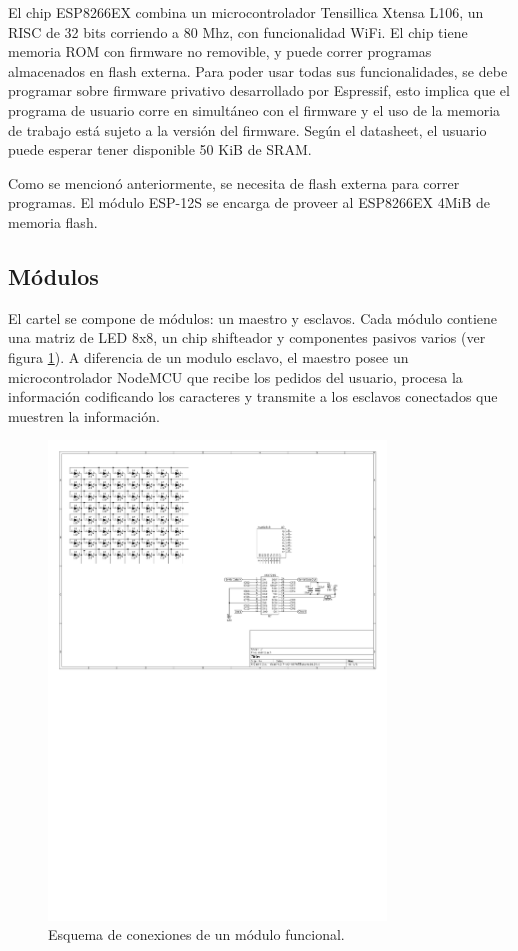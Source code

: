 El chip ESP8266EX combina un microcontrolador Tensillica Xtensa L106, un RISC de 32 bits corriendo a 80 Mhz, con funcionalidad WiFi. \cite{ESP8266Datasheet} El chip tiene memoria ROM con firmware no removible, y puede correr programas almacenados en flash externa. Para poder usar todas sus funcionalidades, se debe programar sobre firmware privativo desarrollado por Espressif, esto implica que el programa de usuario corre en simultáneo con el firmware y el uso de la memoria de trabajo está sujeto a la versión del firmware. Según el datasheet, el usuario puede esperar tener disponible 50 KiB de SRAM.

Como se mencionó anteriormente, se necesita de flash externa para correr programas. El módulo ESP-12S se encarga de proveer al ESP8266EX 4MiB de memoria flash.

\subsection{Módulos}
El cartel se compone de módulos: un maestro y esclavos. Cada módulo contiene una matriz de LED 8x8, un chip shifteador \cite{MAX7219} y componentes pasivos varios (ver figura \ref{fig:hw-moduloEsquematico}). A diferencia de un modulo esclavo, el maestro posee un microcontrolador NodeMCU que recibe los pedidos del usuario, procesa la información codificando los caracteres y transmite a los esclavos conectados que muestren la información.

\begin{figure}[ht!]
	\begin{center}
		\includegraphics[width=0.8\textwidth]{imagenes/hw/moduloEsquematico}
		\caption{Esquema de conexiones de un módulo funcional.}
		\label{fig:hw-moduloEsquematico}
	\end{center}
\end{figure}


